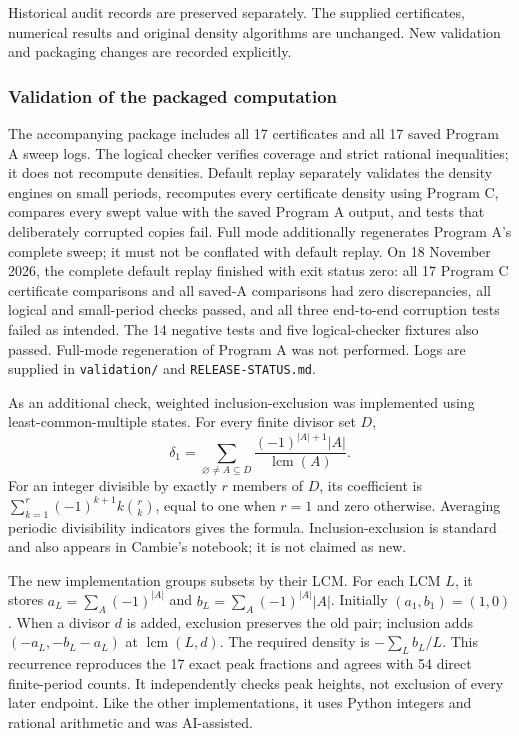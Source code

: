 \documentclass[
  11pt,
]{article}
\begin{document}
Historical audit records are preserved separately. The supplied
certificates, numerical results and original density algorithms are
unchanged. New validation and packaging changes are recorded explicitly.

\subsubsection{Validation of the packaged
computation}\label{validation-of-the-packaged-computation}

The accompanying package includes all 17 certificates and all 17 saved
Program A sweep logs. The logical checker verifies coverage and strict
rational inequalities; it does not recompute densities. Default replay
separately validates the density engines on small periods, recomputes
every certificate density using Program C, compares every swept value
with the saved Program A output, and tests that deliberately corrupted
copies fail. Full mode additionally regenerates Program A's complete
sweep; it must not be conflated with default replay. On 18 November
2026, the complete default replay finished with exit status zero: all 17
Program C certificate comparisons and all saved-A comparisons had zero
discrepancies, all logical and small-period checks passed, and all three
end-to-end corruption tests failed as intended. The 14 negative tests
and five logical-checker fixtures also passed. Full-mode regeneration of
Program A was not performed. Logs are supplied in \texttt{validation/}
and \texttt{RELEASE-STATUS.md}.

As an additional check, weighted inclusion-exclusion was implemented
using least-common-multiple states. For every finite divisor set \(D\),
\[\delta_1=\sum_{\varnothing\ne A\subseteq D}\frac{(-1)^{|A|+1}|A|}{\operatorname{lcm}(A)}.\]
For an integer divisible by exactly \(r\) members of \(D\), its
coefficient is \(\sum_{k=1}^{r}(-1)^{k+1}k\binom{r}{k}\), equal to one
when \(r=1\) and zero otherwise. Averaging periodic divisibility
indicators gives the formula. Inclusion-exclusion is standard and also
appears in Cambie's notebook; it is not claimed as new.

The new implementation groups subsets by their LCM. For each LCM \(L\),
it stores \(a_L=\sum_A(-1)^{|A|}\) and \(b_L=\sum_A(-1)^{|A|}|A|\).
Initially \((a_1,b_1)=(1,0)\). When a divisor \(d\) is added, exclusion
preserves the old pair; inclusion adds \((-a_L,-b_L-a_L)\) at
\(\operatorname{lcm}(L,d)\). The required density is \(-\sum_L b_L/L\).
This recurrence reproduces the 17 exact peak fractions and agrees with
54 direct finite-period counts. It independently checks peak heights,
not exclusion of every later endpoint. Like the other implementations,
it uses Python integers and rational arithmetic and was AI-assisted.
\end{document}
